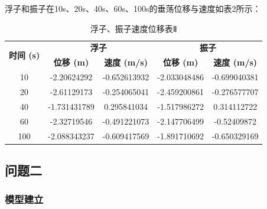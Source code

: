 \documentclass{my_paper}
\begin{document}
浮子和振子在10s、20s、40s、60s、100s的垂荡位移与速度如表2所示：
\begin{table}[!h]
    \setlength{\belowcaptionskip}{0.2cm}
    \caption{浮子、振子速度位移表Ⅱ}
    \centering
    \begin{tabular}{|c|cc|cc|}
    \hline
    \multirow{2}{*}{\textbf{时间 (s)}} & \multicolumn{2}{c|}{\textbf{浮子}}                         & \multicolumn{2}{c|}{\textbf{振子}}                         \\ \cline{2-5} 
                                     & \multicolumn{1}{c|}{\textbf{位移 (m)}} & \textbf{速度 (m/s)} & \multicolumn{1}{c|}{\textbf{位移 (m)}} & \textbf{速度 (m/s)} \\ \hline
    10                               & \multicolumn{1}{c|}{-2.20624292}     & -0.652613932      & \multicolumn{1}{c|}{-2.033048486}    & -0.699040381      \\ \hline
    20                               & \multicolumn{1}{c|}{-2.61129173}     & -0.254065041      & \multicolumn{1}{c|}{-2.459200861}    & -0.276577707      \\ \hline
    40                               & \multicolumn{1}{c|}{-1.731431789}    & 0.295841034       & \multicolumn{1}{c|}{-1.517986272}    & 0.314112722       \\ \hline
    60                               & \multicolumn{1}{c|}{-2.32719546}     & -0.491221073      & \multicolumn{1}{c|}{-2.147706499}    & -0.52409872       \\ \hline
    100                              & \multicolumn{1}{c|}{-2.088343237}    & -0.609417569      & \multicolumn{1}{c|}{-1.891710692}    & -0.650329169      \\ \hline
    \end{tabular}
 
    \end{table}





\subsection{问题二}

\subsubsection{模型建立}
\end{document}
